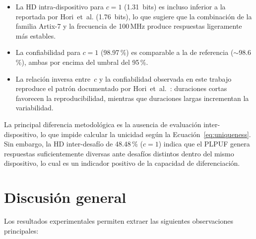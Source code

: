 \begin{itemize}
  \item La HD intra-dispositivo para $c = 1$ (1.31~bits) es incluso inferior
    a la reportada por Hori~et~al. (1.76~bits), lo que sugiere que la
    combinación de la familia Artix-7 y la frecuencia de 100\,MHz produce
    respuestas ligeramente más estables.

  \item La confiabilidad para $c = 1$ (98.97\,\%) es comparable a la de
    referencia ($\sim$98.6\,\%), ambas por encima del umbral del 95\,\%.

  \item La relación inversa entre~$c$ y la confiabilidad observada en este
    trabajo reproduce el patrón documentado por
    Hori~et~al.~\cite{hori_2011_pseudolfsr}: duraciones cortas favorecen la
    reproducibilidad, mientras que duraciones largas incrementan la
    variabilidad.
\end{itemize}

La principal diferencia metodológica es la ausencia de evaluación
inter-dispositivo, lo que impide calcular la unicidad según la
Ecuación~\ref{eq:uniqueness}. Sin embargo, la HD inter-desafío de 48.48\,\%
($c = 1$) indica que el PLPUF genera respuestas suficientemente diversas
ante desafíos distintos dentro del mismo dispositivo, lo cual es un
indicador positivo de la capacidad de diferenciación.

\section{Discusión general}
\label{sec:res_discusion}

Los resultados experimentales permiten extraer las siguientes observaciones
principales:

